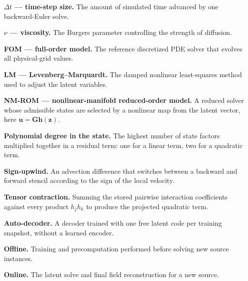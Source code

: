\documentclass[11pt]{article}
\newcommand{\mat}[1]{\mathbf{#1}}
\newcommand{\vect}[1]{\mathbf{#1}}
\begin{document}
\textbf{$\Delta t$ --- time-step size.}
The amount of simulated time advanced by one backward-Euler solve.

\textbf{$\nu$ --- viscosity.}
The Burgers parameter controlling the strength of diffusion.

\textbf{FOM --- full-order model.}
The reference discretized PDE solver that evolves all physical-grid values.

\textbf{LM --- Levenberg--Marquardt.}
The damped nonlinear least-squares method used to adjust the latent variables.

\textbf{NM-ROM --- nonlinear-manifold reduced-order model.}
A reduced solver whose admissible states are selected by a nonlinear map from
the latent vector, here $\vect{u}=\mat{G}\vect{h}(\vect{z})$.

\textbf{Polynomial degree in the state.}
The highest number of state factors multiplied together in a residual term:
one for a linear term, two for a quadratic term.

\textbf{Sign-upwind.}
An advection difference that switches between a backward and forward stencil
according to the sign of the local velocity.

\textbf{Tensor contraction.}
Summing the stored pairwise interaction coefficients against every product
$h_jh_k$ to produce the projected quadratic term.

\textbf{Auto-decoder.}
A decoder trained with one free latent code per training snapshot, without a
learned encoder.

\textbf{Offline.}
Training and precomputation performed before solving new source instances.

\textbf{Online.}
The latent solve and final field reconstruction for a new source.

\endgroup
\end{document}
